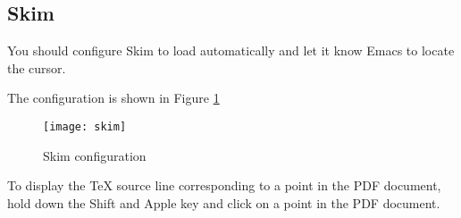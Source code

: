\subsection{Skim}
\label{sec:skim}

You should configure Skim to load automatically and let it know Emacs to locate the cursor.

The configuration is shown in Figure \ref{fig:skim-config}
\begin{figure}[!htbp]
  \centering
  \texttt{[image: skim]}
  \caption{Skim configuration}
  \label{fig:skim-config}
\end{figure}

To display the TeX source line corresponding to a point in the PDF document, hold down the Shift and Apple key and click on a point in the PDF document.

